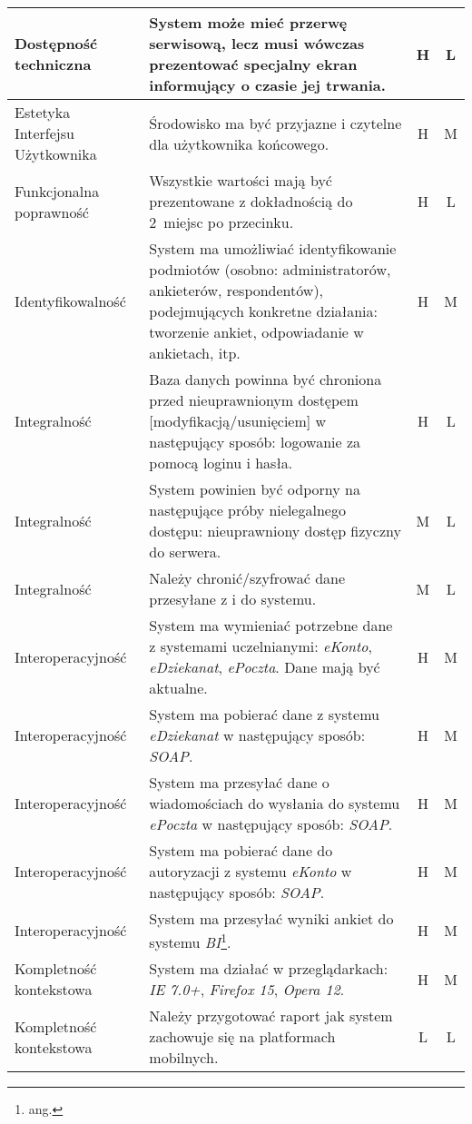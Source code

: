 \begin{center}
\begin{longtable}{ | p{4cm} | p{9cm} | c | c | }
%
Dostępność techniczna & System może mieć przerwę serwisową, lecz musi wówczas prezentować specjalny ekran informujący o czasie jej trwania. & H & L \\ \hline
%
Estetyka Interfejsu Użytkownika & Środowisko ma być przyjazne i czytelne dla użytkownika końcowego. & H & M \\ \hline
%
Funkcjonalna poprawność & Wszystkie wartości mają być prezentowane z dokładnością do 2~miejsc po przecinku. & H & L \\ \hline
%
Identyfikowalność & System ma umożliwiać identyfikowanie podmiotów (osobno: administratorów, ankieterów, respondentów), podejmujących konkretne działania: tworzenie ankiet, odpowiadanie w 
ankietach, itp. & H & M \\ \hline
%
Integralność & Baza danych powinna być chroniona przed nieuprawnionym dostępem [modyfikacją\slash usunięciem] w następujący sposób: logowanie za pomocą loginu i hasła. & H & L \\ \hline
Integralność & System powinien być odporny na następujące próby nielegalnego dostępu: nieuprawniony dostęp fizyczny do serwera. & M & L \\ \hline
Integralność & Należy chronić\slash szyfrować dane przesyłane z i do systemu. & M & L \\ \hline
%
Interoperacyjność & System ma wymieniać potrzebne dane z systemami uczelnianymi: \textit{eKonto}, \textit{eDziekanat}, \textit{ePoczta}. Dane mają być aktualne. & H & M \\ \hline
Interoperacyjność & System ma pobierać dane z systemu \textit{eDziekanat} w następujący sposób: \textit{SOAP}. & H & M \\ \hline
Interoperacyjność & System ma przesyłać dane o wiadomościach do wysłania do systemu \textit{ePoczta} w następujący sposób: \textit{SOAP}. & H & M \\ \hline
Interoperacyjność & System ma pobierać dane do autoryzacji z systemu \textit{eKonto} w następujący sposób: \textit{SOAP}. & H & M \\ \hline
Interoperacyjność & System ma przesyłać wyniki ankiet do systemu \textit{BI}\footnote{ang. {Business Intelligence}}. & H & M \\ \hline
%
Kompletność kontekstowa & System ma działać w przeglądarkach: \textit{IE 7.0+}, \textit{Firefox 15}, \textit{Opera 12}. & H & M \\ \hline
Kompletność kontekstowa & Należy przygotować raport jak system zachowuje się na platformach mobilnych. & L & L \\ \hline

\end{longtable}
\end{center}
